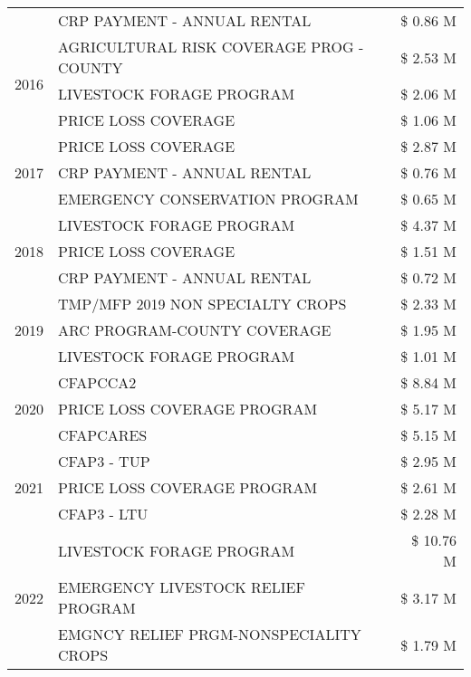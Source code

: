 \begin{tabular}{llr}
 & CRP PAYMENT - ANNUAL RENTAL & \$ 0.86 M \\
\cline{1-3}
\multirow[t]{3}{*}{2016} & AGRICULTURAL RISK COVERAGE PROG - COUNTY & \$ 2.53 M \\
 & LIVESTOCK FORAGE PROGRAM & \$ 2.06 M \\
 & PRICE LOSS COVERAGE & \$ 1.06 M \\
\cline{1-3}
\multirow[t]{3}{*}{2017} & PRICE LOSS COVERAGE & \$ 2.87 M \\
 & CRP PAYMENT - ANNUAL RENTAL & \$ 0.76 M \\
 & EMERGENCY CONSERVATION PROGRAM & \$ 0.65 M \\
\cline{1-3}
\multirow[t]{3}{*}{2018} & LIVESTOCK FORAGE PROGRAM & \$ 4.37 M \\
 & PRICE LOSS COVERAGE & \$ 1.51 M \\
 & CRP PAYMENT - ANNUAL RENTAL & \$ 0.72 M \\
\cline{1-3}
\multirow[t]{3}{*}{2019} & TMP/MFP 2019 NON SPECIALTY CROPS & \$ 2.33 M \\
 & ARC PROGRAM-COUNTY COVERAGE & \$ 1.95 M \\
 & LIVESTOCK FORAGE PROGRAM & \$ 1.01 M \\
\cline{1-3}
\multirow[t]{3}{*}{2020} & CFAPCCA2 & \$ 8.84 M \\
 & PRICE LOSS COVERAGE PROGRAM & \$ 5.17 M \\
 & CFAPCARES & \$ 5.15 M \\
\cline{1-3}
\multirow[t]{3}{*}{2021} & CFAP3 - TUP & \$ 2.95 M \\
 & PRICE LOSS COVERAGE PROGRAM & \$ 2.61 M \\
 & CFAP3 - LTU & \$ 2.28 M \\
\cline{1-3}
\multirow[t]{3}{*}{2022} & LIVESTOCK FORAGE PROGRAM & \$ 10.76 M \\
 & EMERGENCY LIVESTOCK RELIEF PROGRAM & \$ 3.17 M \\
 & EMGNCY RELIEF PRGM-NONSPECIALITY CROPS & \$ 1.79 M \\
\cline{1-3}
\bottomrule
\end{tabular}
